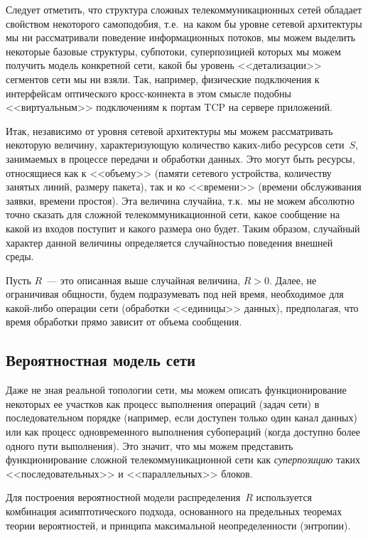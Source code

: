 \begin{multicols}{2}
Следует отметить, что структура сложных телекоммуникационных сетей обладает
свойством некоторого самоподобия, т.е.\ на каком бы уровне сетевой архитектуры
мы ни рассматривали поведение информационных потоков, мы можем выделить
некоторые базовые структуры, субпотоки, суперпозицией которых мы можем получить
модель конкретной сети, какой бы уровень <<детализации>> сегментов сети мы ни
взяли. Так, например, физические подключения к интерфейсам оптического
кросс-коннекта в этом смысле подобны <<виртуальным>> подключениям к портам TCP
на сервере приложений.

Итак, независимо от уровня сетевой архитектуры мы можем
рассматривать некоторую величину, характеризующую количество каких-либо
ресурсов сети~$S$, занимаемых в процессе передачи и обработки данных.  Это
могут быть ресурсы, относящиеся как к <<объему>> (памяти сетевого
устройства, количеству занятых линий, размеру пакета), так и ко <<времени>>
(времени обслуживания заявки, времени простоя). Эта величина случайна, т.к.\
мы не можем абсолютно точно сказать для сложной телекоммуникационной
сети, какое сообщение на какой из входов поступит и какого размера оно будет.
Таким образом, случайный характер данной величины определяется
случайностью поведения внешней среды.

Пусть $R$~--- это описанная выше случайная величина, $R>0$. Далее, не
ограничивая общности, будем подразумевать под ней время, необходимое для
какой-либо операции сети (обработки <<единицы>> данных), предполагая, что
время обработки прямо зависит от объема сообщения.

\subsection{Вероятностная модель сети} %

Даже не зная реальной топологии сети, мы можем описать
функционирование некоторых ее участков как процесс выполнения операций
(задач сети) в последовательном  порядке (например, если доступен только
один канал данных) или как процесс одновременного выполнения субопераций
(когда доступно более одного пути выполнения). Это значит, что мы можем
представить функционирование сложной телекоммуникационной сети как
\textit{суперпозицию} таких <<последовательных>> и <<параллельных>>
блоков.

Для построения вероятностной модели распределения~$R$ используется
комбинация асимптотического подхода, основанного на предельных теоремах
теории вероятностей, и принципа максимальной неопределенности (энтропии).


\end{multicols}
